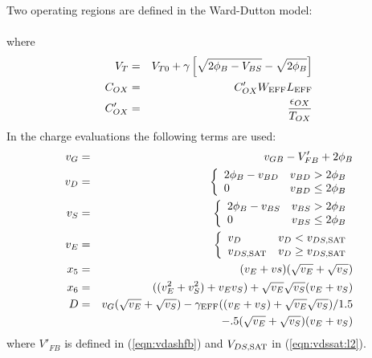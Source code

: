 {Two operating regions are defined in the Ward-Dutton model:\\[0.1in]
\hspace*{\fill}\\[0.1in]
\noindent where
\begin{eqnarray}
V_{T} & = & V_{T0} + \gamma
        \left[\sqrt{2\phi_B - V_{BS}}-\sqrt{2\phi_B} \right]\\
C_{OX}&=& C'_{OX}W_{\mbox{\scriptsize EFF}} L_{\mbox{\scriptsize EFF}}\\
C'_{OX}&=&{{\epsilon_{OX}} \over { T_{OX}}}\\
\end{eqnarray}
\noindent In the charge evaluations the following terms are used:
\begin{eqnarray}
  v_{G}  &=& v_{GB} - V'_{FB} + \PHI\\
    v_D  &=& \left\{ \begin{array}{ll}
             \PHI - v_{BD} & v_{BD} > \PHI \\
             0 &v_{BD} \le \PHI
             \end{array} \right. %
             \\
    v_S  &=& \left\{ \begin{array}{ll}
             \PHI - v_{BS} & v_{BS} > \PHI \\
             0 &v_{BS} \le \PHI
             \end{array} \right. %
             \\
    v_E  &=& \left\{ \begin{array}{ll}
              v_D     & v_D < v_{DS,\ms{SAT}}\\
              v_{DS,\ms{SAT}} & v_D \ge v_{DS,\ms{SAT}}
              \end{array}
              \right. %
              \\
    x_5  &=& (v_E + vs)( \sqrt{v_E} + \sqrt{v_S})\\
    x_6  &=& ((v_E^2+v_S^2) + v_Ev_S) + \sqrt{v_E}\sqrt{v_S} (v_E+v_S)\\
    D   &=& v_G (\sqrt{v_E}+\sqrt{v_S})
          - \gamma_{\ms{EFF}} ( (v_E+v_S) + \sqrt{v_E}\sqrt{v_S} )/1.5
          \nonumber \\
          && - .5 (\sqrt{v_E}+\sqrt{v_S}) (v_E+v_S)
\end{eqnarray}
where $V'_{FB}$ is defined in (\ref{eqn:vdashfb}) and $V_{DS,\mbox{\scriptsize SAT}}$ in
(\ref{eqn:vdssat:l2}).

}
